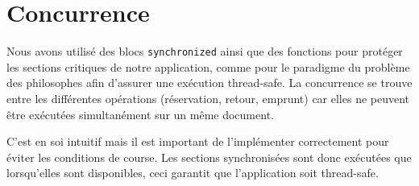 \chapter{Concurrence}

Nous avons utilisé des blocs \texttt{synchronized} ainsi que des fonctions pour protéger les sections critiques de notre application, comme pour le paradigme du problème des philosophes afin d’assurer une exécution thread-safe. La concurrence se trouve entre les différentes opérations (réservation, retour, emprunt) car elles ne peuvent être exécutées simultanément sur un même document.

C’est en soi intuitif mais il est important de l’implémenter correctement pour éviter les conditions de course. Les sections synchronisées sont donc exécutées que lorsqu’elles sont disponibles, ceci garantit que l’application soit thread-safe.
